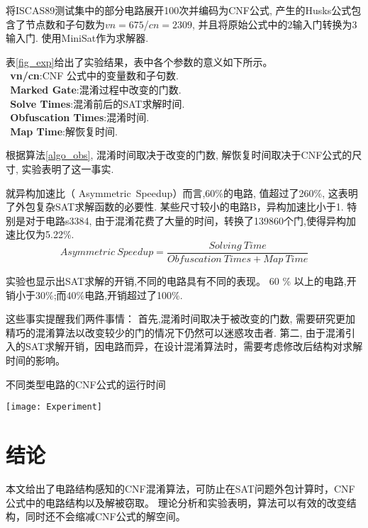 将ISCAS89测试集中的部分电路展开100次并编码为CNF公式,
产生的Husks公式包含了节点数和子句数为$vn=675$/$cn=2309$,
并且将原始公式中的2输入门转换为3输入门.
使用MiniSat作为求解器.

表\ref{fig_exp}给出了实验结果，表中各个参数的意义如下所示。 \\
$~~$\textbf{vn/cn}:CNF 公式中的变量数和子句数.\\
$~~$\textbf{Marked Gate}:混淆过程中改变的门数.\\
$~~$\textbf{Solve Times}:混淆前后的SAT求解时间.\\
$~~$\textbf{Obfuscation Times}:混淆时间.\\
$~~$\textbf{Map Time}:解恢复时间.

根据算法\ref{algo_obs},
混淆时间取决于改变的门数,
解恢复时间取决于CNF公式的尺寸,
实验表明了这一事实.

就异构加速比（ Asymmetric~Speedup）\cite{c.WANG}而言,60\%的电路, 值超过了260\%,
这表明了外包复杂SAT求解函数的必要性.
某些尺寸较小的电路B，异构加速比小于1.
特别是对于电路s3384,
由于混淆花费了大量的时间，转换了139860个门,使得异构加速比仅为5.22\%.
\begin{equation}
 Asymmetric~Speedup= \frac{Solving~Time}{Obfuscation~Times + Map~Time}
\end{equation}

实验也显示出SAT求解的开销,不同的电路具有不同的表现。
60 \% 以上的电路,开销小于30\%;而40\%电路,开销超过了100\%.

这些事实提醒我们两件事情：
首先,混淆时间取决于被改变的门数,
需要研究更加精巧的混淆算法以改变较少的门的情况下仍然可以迷惑攻击者.
第二, 由于混淆引入的SAT求解开销，因电路而异，在设计混淆算法时，需要考虑修改后结构对求解时间的影响。

\begin{table*}
\caption{不同类型电路的CNF公式的运行时间}
\centering
\texttt{[image: Experiment]}
\label{fig_exp}
\end{table*}%
%
\section{结论}
本文给出了电路结构感知的CNF混淆算法，可防止在SAT问题外包计算时，CNF公式中的电路结构以及解被窃取。
理论分析和实验表明，算法可以有效的改变结构，同时还不会缩减CNF公式的解空间。
